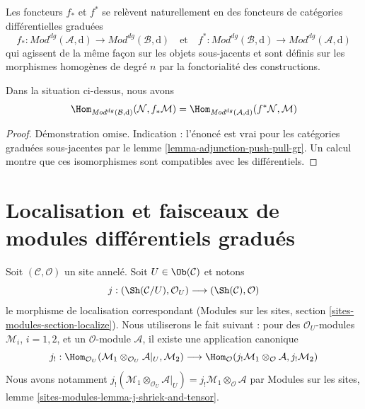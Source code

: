 \medskip\noindent
Les foncteurs $f_*$ et $f^*$ se relèvent naturellement en des foncteurs de catégories différentielles graduées
$$
f_* :
\textit{Mod}^{dg}(\mathcal{A}, \text{d})
\longrightarrow
\textit{Mod}^{dg}(\mathcal{B}, \text{d})
\quad\text{et}\quad
f^* :
\textit{Mod}^{dg}(\mathcal{B}, \text{d})
\longrightarrow
\textit{Mod}^{dg}(\mathcal{A}, \text{d})
$$
qui agissent de la même façon sur les objets sous-jacents et sont définis sur les morphismes homogènes de degré $n$ par la fonctorialité des constructions.

\begin{lemma}
\label{lemma-adjunction-push-pull-dg}
Dans la situation ci-dessus, nous avons
$$
\Hom_{\textit{Mod}^{dg}(\mathcal{B}, \text{d})}(
\mathcal{N}, f_*\mathcal{M}) =
\Hom_{\textit{Mod}^{dg}(\mathcal{A}, \text{d})}(
f^*\mathcal{N}, \mathcal{M})
$$
\end{lemma}

\begin{proof}
Démonstration omise.
Indication : l'énoncé est vrai pour les catégories graduées sous-jacentes par le lemme \ref{lemma-adjunction-push-pull-gr}.
Un calcul montre que ces isomorphismes sont compatibles avec les différentiels.
\end{proof}















\section{Localisation et faisceaux de modules différentiels gradués}
\label{section-localize-dg}

\noindent
Soit $(\mathcal{C}, \mathcal{O})$ un site annelé.
Soit $U \in \Ob(\mathcal{C})$ et notons
$$
j :
(\Sh(\mathcal{C}/U), \mathcal{O}_U)
\longrightarrow
(\Sh(\mathcal{C}), \mathcal{O})
$$
le morphisme de localisation correspondant (Modules sur les sites, section \ref{sites-modules-section-localize}).
Nous utiliserons le fait suivant : pour des $\mathcal{O}_U$-modules $\mathcal{M}_i$, $i = 1, 2$, et un $\mathcal{O}$-module $\mathcal{A}$, il existe une application canonique
$$
j_! :
\Hom_{\mathcal{O}_U}(
\mathcal{M}_1 \otimes_{\mathcal{O}_U} \mathcal{A}|_U, \mathcal{M}_2)
\longrightarrow
\Hom_\mathcal{O}(
j_!\mathcal{M}_1 \otimes_\mathcal{O} \mathcal{A}, j_!\mathcal{M}_2)
$$
Nous avons notamment $j_!(\mathcal{M}_1 \otimes_{\mathcal{O}_U} \mathcal{A}|_U) = j_!\mathcal{M}_1 \otimes_\mathcal{O} \mathcal{A}$ par Modules sur les sites, lemme \ref{sites-modules-lemma-j-shriek-and-tensor}.

